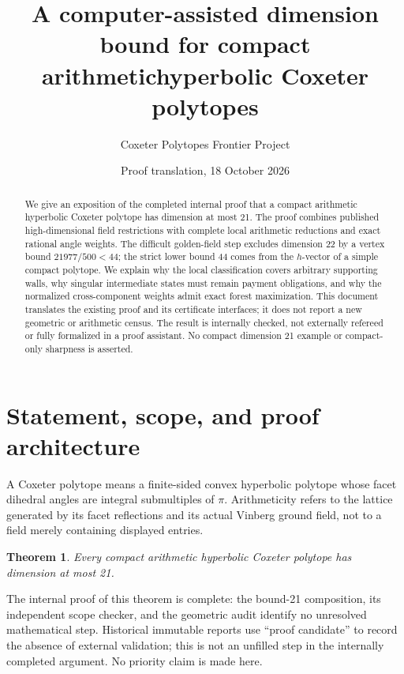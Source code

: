 \documentclass[11pt]{article}
\title{A computer-assisted dimension bound for compact arithmetic\linebreak hyperbolic Coxeter polytopes}
\author{Coxeter Polytopes Frontier Project}
\date{Proof translation, 18 October 2026}
\newtheorem{theorem}{Theorem}[section]
\begin{document}
\maketitle
\begin{abstract}
We give an exposition of the completed internal proof that a compact arithmetic
hyperbolic Coxeter polytope has dimension at most 21. The proof combines
published high-dimensional field restrictions with complete local arithmetic
reductions and exact rational angle weights. The difficult golden-field step
excludes dimension 22 by a vertex bound $21977/500<44$; the strict lower bound 44
comes from the $h$-vector of a simple compact polytope. We explain why the
local classification covers arbitrary supporting walls, why singular
intermediate states must remain payment obligations, and why the normalized
cross-component weights admit exact forest maximization. This document
translates the existing proof and its certificate interfaces; it does not
report a new geometric or arithmetic census. The result is internally checked,
not externally refereed or fully formalized in a proof assistant. No
compact dimension 21 example or compact-only sharpness is asserted.
\end{abstract}

\section{Statement, scope, and proof architecture}
A Coxeter polytope means a finite-sided convex hyperbolic polytope whose
facet dihedral angles are integral submultiples of $\pi$. Arithmeticity
refers to the lattice generated by its facet reflections and its actual
Vinberg ground field, not to a field merely containing displayed entries.
\begin{theorem}\label{thm:main}
Every compact arithmetic hyperbolic Coxeter polytope has dimension at most 21.
\end{theorem}
The internal proof of this theorem is complete: the bound-21 composition,
its independent scope checker, and the geometric audit identify no unresolved
mathematical step. Historical immutable reports use ``proof candidate'' to
record the absence of external validation; this is not an unfilled step in
the internally completed argument. No priority claim is made here.
\end{document}
